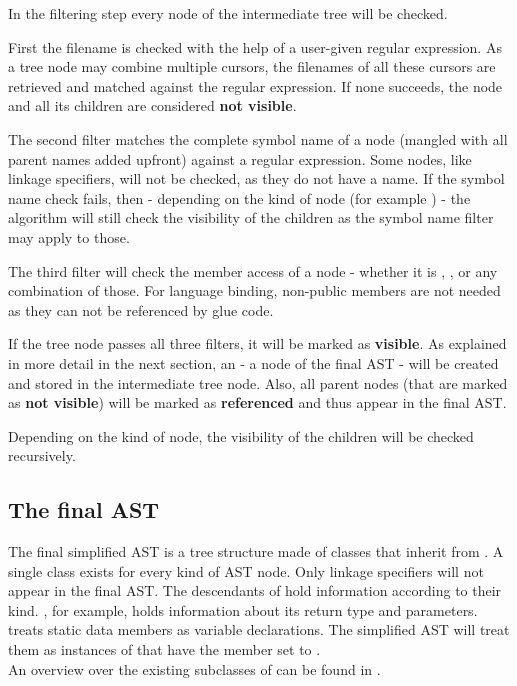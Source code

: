 In the filtering step every node of the intermediate tree will be checked.

First the filename is checked with the help of a user-given regular expression. As a tree node may combine multiple cursors, the filenames of all these cursors are retrieved and matched against the regular expression. If none succeeds, the node and all its children are considered \textbf{not visible}.

The second filter matches the complete symbol name of a node (mangled with all parent names added upfront) against a regular expression. Some nodes, like linkage specifiers, will not be checked, as they do not have a name. If the symbol name check fails, then - depending on the kind of node (for example ) - the algorithm will still check the visibility of the children as the symbol name filter may apply to those.

The third filter will check the member access of a node - whether it is , ,  or any combination of those. For language binding, non-public members are not needed as they can not be referenced by glue code.

If the tree node passes all three filters, it will be marked as \textbf{visible}. As explained in more detail in the next section, an  - a node of the final AST - will be created and stored in the intermediate tree node. Also, all parent nodes (that are marked as \textbf{not visible}) will be marked as \textbf{referenced} and thus appear in the final AST.

Depending on the kind of node, the visibility of the children will be checked recursively.


\subsection{The final AST}

The final simplified AST is a tree structure made of classes that inherit from
. A single class exists for every kind of AST node. Only linkage specifiers will not appear in the final AST. The descendants of  hold information according to their kind. , for example, holds information about its return type and parameters.  treats static data members as variable declarations. The simplified AST will treat them as instances of  that have the  member set to .\\
An overview over the existing subclasses of  can be found in .

